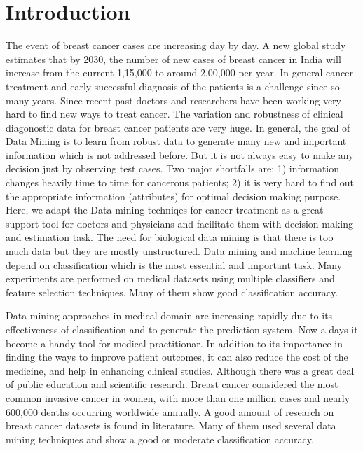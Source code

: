 \documentclass[conference]{IEEEtran}
\begin{document}
\section{Introduction}
The event of breast cancer cases are increasing day by day. A new global study estimates that by 2030, the number of new cases of breast cancer in India will increase from the current 1,15,000 to around 2,00,000 per year\cite{IEEEhowto:nci}. In general cancer treatment and early successful diagnosis of the patients is a challenge since so many years. Since recent past doctors and researchers have been working very hard to find new ways to treat cancer. The variation and robustness of clinical diagonostic data for breast cancer patients are very huge. In general, the goal of Data Mining is to learn from robust data to generate many new and important information which is not addressed before. But it is not always easy to make any decision just by observing  test cases. Two major shortfalls are: 1) information changes heavily time to time for cancerous patients; 2) it is very hard to find out the appropriate information (attributes) for optimal decision making purpose\cite{IEEEhowto:delen}. Here, we adapt the Data mining techniqes for cancer treatment as a great support tool for doctors and physicians and facilitate them with decision making and estimation task. The need for biological data mining is that there is too much data but they are mostly unstructured. Data mining and machine learning depend on classification which is the most essential and important task. Many experiments are performed on medical datasets using multiple classifiers and feature selection techniques. Many of them show good classification accuracy.

Data mining approaches in medical domain are increasing rapidly due to its effectiveness of classification and to generate the prediction system. Now-a-days it become a handy tool for medical practitionar. In addition to its importance in finding the ways to improve patient outcomes, it can also reduce the cost of the medicine, and help in enhancing clinical studies. Although there was a great deal of public education and scientific research. Breast cancer considered the most common invasive cancer in women, with more than one million cases and nearly 600,000 deaths occurring worldwide annually\cite{IEEEhowto:nci}.  A good amount of research on breast cancer datasets is found in literature\cite{IEEEhowto:elsayad, IEEEhowto:shajahaan, IEEEhowto:samar, IEEEhowto:chaurasia}. Many of them used several data mining techniques and show a good or moderate classification accuracy.
\end{document}
